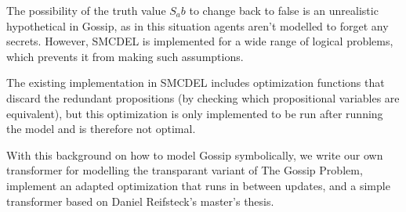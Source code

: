 

The possibility of the truth value $S_ab$ to change back to false is an unrealistic hypothetical in Gossip, as in this situation 
agents aren't modelled to forget any secrets. However, SMCDEL is implemented for a wide range of logical problems, which prevents it 
from making such assumptions. 

The existing implementation in SMCDEL includes optimization functions that discard the redundant propositions 
(by checking which propositional variables are equivalent), but this optimization is only implemented to be run after running the 
model and is therefore not optimal. 

With this background on how to model Gossip symbolically, we write our own transformer for modelling the transparant variant 
of The Gossip Problem, implement an adapted optimization that runs in between updates, and a simple transformer based on Daniel 
Reifsteck's master's thesis. 
